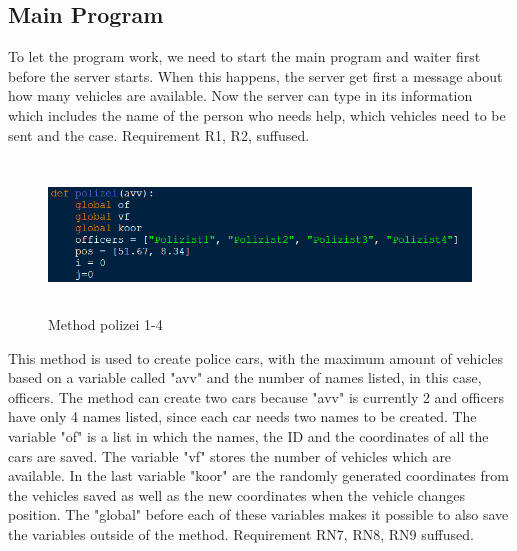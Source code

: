 \documentclass{article}
\begin{document}
\subsection{Main Program}
To let the program work, we need to start the main program and waiter first before the server starts. When this happens, the server get first a message about how many vehicles are available. Now the server can type in its information which includes the name of the person who needs help, which vehicles need to be sent and the case.
 Requirement R1, R2, suffused.
\begin{figure}[htp]
    \centering
\includegraphics[width=12cm, height=4cm]{images/Ostrzinski/I1}
   \caption{Method polizei 1-4}
    \label{fig:GALAXY}
\end{figure}
\newline
\newline
This method is used to create police cars, with the maximum amount of vehicles based on a variable called "avv" and the number of names listed, in this case, officers. The method can create two cars because "avv" is currently 2 and officers have only 4 names listed, since each car needs two names to be created.
\newline
The variable "of" is a list in which the names, the ID and the coordinates of all the cars are saved.
The variable "vf" stores the number of vehicles which are available.
In the last variable "koor" are the randomly generated coordinates from the vehicles saved as well as the new coordinates when the vehicle changes position.
\newline
The "global" before each of these variables makes it possible to also save the variables outside of the method. Requirement RN7, RN8, RN9 suffused.
\end{document}
